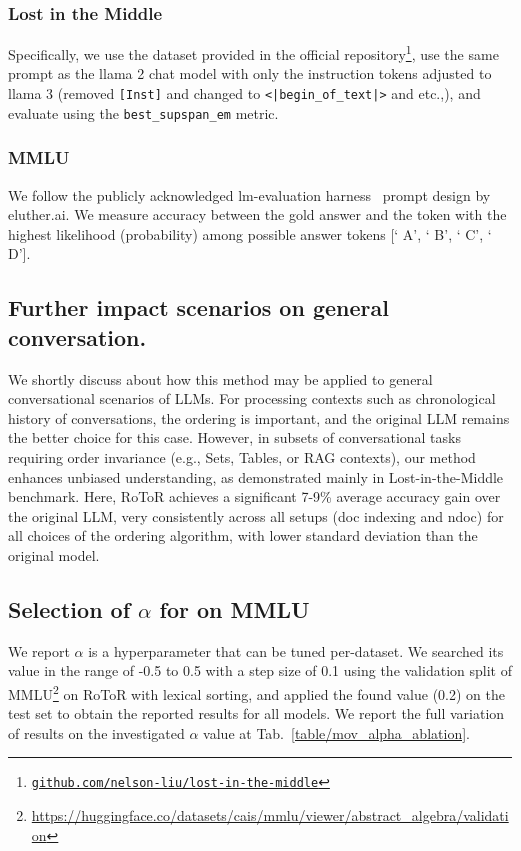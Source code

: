 \subsubsection{Lost in the Middle}
\label{appendix:dataset_details_litm}
Specifically, we use the dataset provided in the official repository\footnote{\href{https://github.com/nelson-liu/lost-in-the-middle/tree/main/qa_data}{\texttt{github.com/nelson-liu/lost-in-the-middle}}}, use the same prompt as the llama 2 chat model with only the instruction tokens adjusted to llama 3 (removed \texttt{[}\texttt{Inst]} and changed to \texttt{<|begin\_of\_text|>} and etc.,), and evaluate using the \texttt{best\_supspan\_em} metric.

\subsubsection{MMLU}
\label{appendix:dataset_details_mmlu}
We follow the publicly acknowledged lm-evaluation harness~\cite{eval-harness} prompt design by eluther.ai. We measure accuracy between the gold answer and the token with the highest likelihood (probability) among possible answer tokens [` A’, ` B’, ` C’, ` D’].

\subsection{Further impact scenarios on general conversation.}
\label{appendix:discussions_about_further_impact}
We shortly discuss about how this method may be applied to general conversational scenarios of LLMs. For processing contexts such as chronological history of conversations, the ordering is important, and the original LLM remains the better choice for this case. However, in subsets of conversational tasks requiring order invariance (e.g., Sets, Tables, or RAG contexts), our method enhances unbiased understanding, as demonstrated mainly in Lost-in-the-Middle benchmark. Here, RoToR achieves a significant 7-9\% average accuracy gain over the original LLM, very consistently across all setups (doc indexing and ndoc) for all choices of the ordering algorithm, with lower standard deviation than the original model.

\subsection{Selection of $\alpha$ for \sr{} on MMLU}
\label{appendix:alpha_search}

We report 
$\alpha$ is a hyperparameter that can be tuned per-dataset. We searched its value in the range of -0.5 to 0.5 with a step size of 0.1 using the validation split of MMLU\footnote{\url{https://huggingface.co/datasets/cais/mmlu/viewer/abstract_algebra/validation}} on RoToR with lexical sorting, and applied the found value (0.2) on the test set to obtain the reported results for all models. We report the full variation of \sr{} results on the investigated $\alpha$ value at Tab.~\ref{table/mov_alpha_ablation}.


